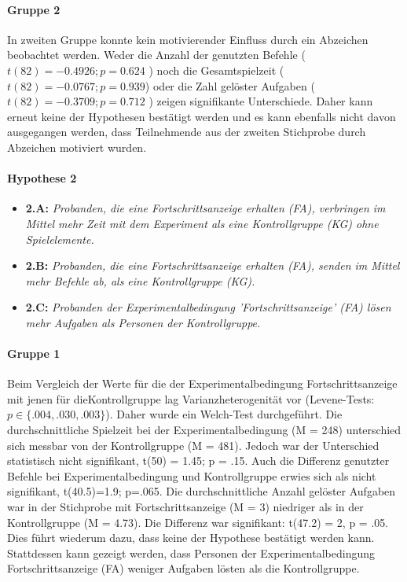 \paragraph{Gruppe 2}
In zweiten Gruppe konnte kein motivierender Einfluss durch ein Abzeichen beobachtet werden. Weder die Anzahl der genutzten Befehle ( $ t(82)=-0.4926; p=0.624 $ ) noch die Gesamtspielzeit ($t(82)=-0.0767; p=0.939$) oder die Zahl gelöster Aufgaben ( $t(82)=-0.3709; p=0.712$ ) zeigen signifikante Unterschiede. Daher kann erneut keine der Hypothesen bestätigt werden und es kann ebenfalls nicht davon ausgegangen werden, dass Teilnehmende aus der zweiten Stichprobe durch Abzeichen motiviert wurden. 


\paragraph{Hypothese 2}
\begin{itemize}
    \item \textbf{2.A:} \textit{Probanden, die eine Fortschrittsanzeige erhalten (FA), verbringen im Mittel mehr Zeit mit dem Experiment als eine Kontrollgruppe (KG) ohne Spielelemente.}
    \item \textbf{2.B:} \textit{Probanden, die eine Fortschrittsanzeige erhalten (FA), senden im Mittel mehr Befehle ab, als eine Kontrollgruppe (KG).}
    \item \textbf{2.C:} \textit{Probanden der Experimentalbedingung 'Fortschrittsanzeige' (FA) lösen mehr Aufgaben als Personen der Kontrollgruppe.} 
\end{itemize}

\paragraph{Gruppe 1}
Beim Vergleich der Werte für die der Experimentalbedingung Fortschrittsanzeige mit jenen für dieKontrollgruppe lag Varianzheterogenität vor (Levene-Tests: $p\in\{.004, .030, .003\}$). Daher wurde ein Welch-Test durchgeführt. Die durchschnittliche Spielzeit bei der Experimentalbedingung (M = 248) unterschied sich messbar von der Kontrollgruppe (M = 481). Jedoch war der Unterschied statistisch nicht signifikant, t(50) = 1.45; p = .15. Auch die Differenz genutzter Befehle bei Experimentalbedingung und Kontrollgruppe erwies sich als nicht signifikant, t(40.5)=1.9; p=.065. Die durchschnittliche Anzahl gelöster Aufgaben war in der Stichprobe mit Fortschrittsanzeige (M = 3) niedriger als in der Kontrollgruppe (M = 4.73). Die Differenz war signifikant: t(47.2) = 2, p = .05. Dies führt wiederum dazu, dass keine der Hypothese bestätigt werden kann. Stattdessen kann gezeigt werden, dass Personen der Experimentalbedingung Fortschrittsanzeige (FA) weniger Aufgaben lösten als die Kontrollgruppe. 


